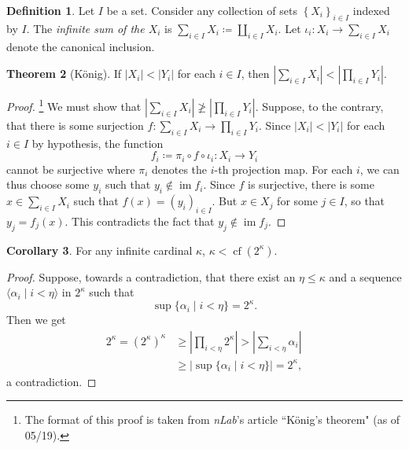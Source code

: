 \documentclass[10pt,letterpaper,cm]{nupset}
\theoremstyle{definition}
\newtheorem{definition}{Definition}[subsection]
\theoremstyle{theorem}
\newtheorem{theorem}[definition]{Theorem}
\newtheorem{corollary}[definition]{Corollary}
\theoremstyle{remark}
\newcommand{\1}{\mathbf{1}}
\newcommand{\0}{\vec 0}
\DeclareMathOperator{\im}{im}
\DeclareMathOperator{\cf}{cf}
\begin{document}
\begin{definition} Let $I$ be a set. Consider any collection of sets $\left\{X_i\right\}_{i\in I}$ indexed by $I$.
The \textit{infinite sum of the $X_i$} is $\sum_{i\in I} X_i \coloneqq \coprod_{i\in I} X_i$. Let $\iota_i : X_i \to \sum_{i\in I} X_i $ denote the canonical inclusion. 
\end{definition}

\begin{theorem}[K\"onig]
If $\left\lvert{X_i}\right\rvert < \left\lvert{Y_i}\right\rvert$ for each $i \in I$, then $\left\lvert{\sum_{i\in I} X_i}\right\rvert < \left\lvert{\prod_{i\in I} Y_i}\right\rvert$.
\end{theorem}
\begin{proof}\footnote{The format of this proof is taken from \textit{nLab}'s article ``K\"onig's theorem" (as of 05/19).}
We must show that $\left\lvert{\sum_{i\in I} X_i}\right\rvert \not \geq \left\lvert{\prod_{i\in I} Y_i}\right\rvert$. Suppose, to the contrary, that there is some surjection $f: \sum_{i\in I} X_i \to \prod_{i\in I} Y_i$. Since $\left\lvert{X_i}\right\rvert < \left\lvert{Y_i}\right\rvert$ for each $i\in I$ by hypothesis, the function $$f_i \coloneqq \pi_i \circ f \circ \iota_i: X_i \to Y_i$$ cannot be surjective where $\pi_i$ denotes the $i$-th projection map. For each $i$, we can thus choose some $y_i$ such that $y_i \notin \im{f_i}$. Since $f$ is surjective, there is some $x\in \sum_{i\in I} X_i $ such that $f(x) = \left(y_i\right)_{i\in I}$. But $x\in X_j$ for some $j\in I$, so that $y_j = f_j(x)$. This contradicts the fact that $y_j \notin \im{f_j}$. 
\end{proof}

\begin{corollary}
For any infinite cardinal $\kappa$, $\kappa< \cf(2^{\kappa})$.
\end{corollary}
\begin{proof}
Suppose, towards a contradiction, that there exist an $\eta \leq \kappa$ and a  sequence $\langle \alpha_i \mid i < \eta \rangle$ in $2^{\kappa}$ such that $$ \sup\{\alpha_i \mid i <\eta\} = 2^{\kappa}.$$ Then we get 
\begin{align*}    
2^{\kappa}  = \left(2^{\kappa}\right)^{\kappa} 
&  \geq  \left\lvert{ \prod_{i < \eta} 2^{\kappa}}\right\rvert 
> \left\lvert{\sum_{i < \eta} \alpha_i}\right\rvert
\\ & \geq \left\lvert{\sup\{\alpha_i \mid i <\eta\}}\right\rvert 
= 2^{\kappa}
,
\end{align*}  a contradiction. 
\end{proof}
\end{document}

